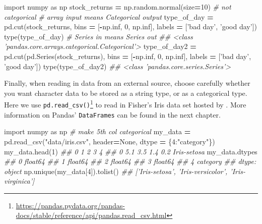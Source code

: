 \documentclass[12pt,krantz2]{krantz}
\makeatletter
\newenvironment{Shaded}{\begin{snugshade}}{\end{snugshade}}
\newcommand{\BuiltInTok}[1]{#1}
\newcommand{\CommentTok}[1]{\textcolor[rgb]{0.37,0.37,0.37}{\textit{#1}}}
\newcommand{\DecValTok}[1]{\textcolor[rgb]{0.06,0.06,0.06}{#1}}
\newcommand{\ImportTok}[1]{#1}
\newcommand{\NormalTok}[1]{#1}
\newcommand{\OperatorTok}[1]{\textcolor[rgb]{0.43,0.43,0.43}{\textbf{#1}}}
\newcommand{\StringTok}[1]{\textcolor[rgb]{0.5,0.5,0.5}{#1}}
\newcommand{\VariableTok}[1]{\textcolor[rgb]{0,0,0}{#1}}
\renewcommand{\href}[2]{#2\footnote{\url{#1}}}
\newenvironment{kframe}{%
\medskip{}
\setlength{\fboxsep}{.8em}
 \def\at@end@of@kframe{}%
 \ifinner\ifhmode%
  \def\at@end@of@kframe{\end{minipage}}%
  \begin{minipage}{\columnwidth}%
 \fi\fi%
 \def\FrameCommand##1{\hskip\@totalleftmargin \hskip-\fboxsep
 \colorbox{shadecolor}{##1}\hskip-\fboxsep
     \hskip-\linewidth \hskip-\@totalleftmargin \hskip\columnwidth}%
 \MakeFramed {\advance\hsize-\width
   \@totalleftmargin\z@ \linewidth\hsize
   \@setminipage}}%
 {\par\unskip\endMakeFramed%
 \at@end@of@kframe}
\renewenvironment{Shaded}{\begin{kframe}}{\end{kframe}}
\makeatother
\begin{document}
\begin{Shaded}
\begin{Highlighting}[]
\ImportTok{import}\NormalTok{ numpy }\ImportTok{as}\NormalTok{ np}
\NormalTok{stock_returns }\OperatorTok{=}\NormalTok{ np.random.normal(size}\OperatorTok{=}\DecValTok{10}\NormalTok{) }\CommentTok{# not categorical }
\CommentTok{# array input means Categorical output}
\NormalTok{type_of_day }\OperatorTok{=}\NormalTok{ pd.cut(stock_returns, }
\NormalTok{                      bins }\OperatorTok{=}\NormalTok{ [}\OperatorTok{-}\NormalTok{np.inf, }\DecValTok{0}\NormalTok{, np.inf], }
\NormalTok{                      labels }\OperatorTok{=}\NormalTok{ [}\StringTok{'bad day'}\NormalTok{, }\StringTok{'good day'}\NormalTok{]) }
\BuiltInTok{type}\NormalTok{(type_of_day)}
\CommentTok{# Series in means Series out}
\CommentTok{## <class 'pandas.core.arrays.categorical.Categorical'>}
\NormalTok{type_of_day2 }\OperatorTok{=}\NormalTok{ pd.cut(pd.Series(stock_returns), }
\NormalTok{                      bins }\OperatorTok{=}\NormalTok{ [}\OperatorTok{-}\NormalTok{np.inf, }\DecValTok{0}\NormalTok{, np.inf], }
\NormalTok{                      labels }\OperatorTok{=}\NormalTok{ [}\StringTok{'bad day'}\NormalTok{, }\StringTok{'good day'}\NormalTok{]) }
\BuiltInTok{type}\NormalTok{(type_of_day2)}
\CommentTok{## <class 'pandas.core.series.Series'>}
\end{Highlighting}
\end{Shaded}

Finally, when reading in data from an external source, choose carefully whether you want character data to be stored as a string type, or as a categorical type. Here we use \href{https://pandas.pydata.org/pandas-docs/stable/reference/api/pandas.read_csv.html}{\texttt{pd.read\_csv()}} to read in Fisher's Iris data set \citep{misc_iris_53} hosted by \citep{uci_data}. More information on Pandas' \texttt{DataFrames} can be found in the next chapter.

\begin{Shaded}
\begin{Highlighting}[]
\ImportTok{import}\NormalTok{ numpy }\ImportTok{as}\NormalTok{ np}
\CommentTok{# make 5th col categorical}
\NormalTok{my_data }\OperatorTok{=}\NormalTok{ pd.read_csv(}\StringTok{"data/iris.csv"}\NormalTok{, header}\OperatorTok{=}\VariableTok{None}\NormalTok{, }
\NormalTok{                        dtype }\OperatorTok{=}\NormalTok{ \{}\DecValTok{4}\NormalTok{:}\StringTok{"category"}\NormalTok{\}) }
\NormalTok{my_data.head(}\DecValTok{1}\NormalTok{)}
\CommentTok{##      0    1    2    3            4}
\CommentTok{## 0  5.1  3.5  1.4  0.2  Iris-setosa}
\NormalTok{my_data.dtypes}
\CommentTok{## 0     float64}
\CommentTok{## 1     float64}
\CommentTok{## 2     float64}
\CommentTok{## 3     float64}
\CommentTok{## 4    category}
\CommentTok{## dtype: object}
\NormalTok{np.unique(my_data[}\DecValTok{4}\NormalTok{]).tolist()}
\CommentTok{## ['Iris-setosa', 'Iris-versicolor', 'Iris-virginica']}
\end{Highlighting}
\end{Shaded}
\end{document}
